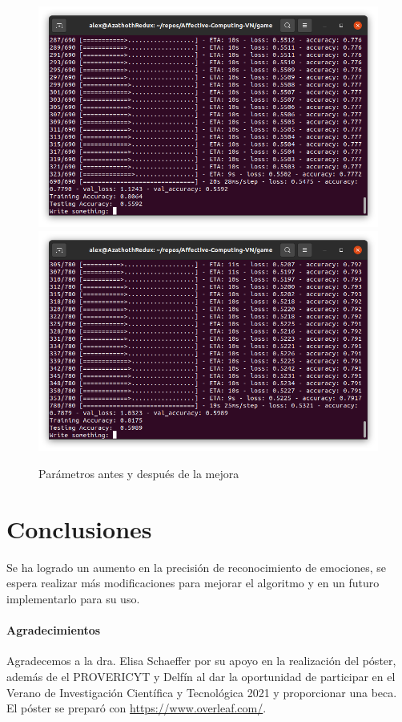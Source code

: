 \documentclass[a4]{sciposter}
\begin{document}
\begin{multicols}{2}
\begin{figure}
	\captionsetup{type=figure}
	\setcounter{figure}{2}
	\includegraphics[scale=0.6]{img/Test 2021-05.png}
	\includegraphics[scale=0.6]{img/Test 2021-07.png}
	\caption{Parámetros antes y después de la mejora}
\end{figure}

\section{Conclusiones}

Se ha logrado un aumento en la precisión de reconocimiento de emociones, se espera realizar más modificaciones para mejorar el algoritmo y en un futuro implementarlo para su uso.

\paragraph{Agradecimientos}

{\small Agradecemos a la dra. Elisa Schaeffer por su apoyo en la realización del póster, además de el PROVERICYT y Delfín al dar la oportunidad de participar en el Verano de Investigación Científica y Tecnológica 2021 y proporcionar una beca.
El póster se preparó con \url{https://www.overleaf.com/}.}





\end{multicols}
\end{document}
